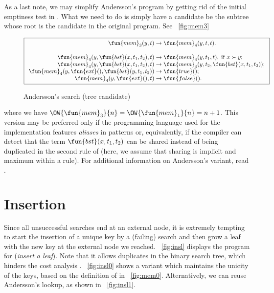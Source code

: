 As a last note, we may simplify Andersson's program by getting rid of
the initial emptiness test in . What we need to do is
simply have a candidate be the subtree whose root is the candidate in
the original program. See \fig~\vref{fig:mem3}
\begin{figure}[b]
\begin{equation*}
\boxed{
\begin{array}{r@{\;}l@{\;}l}
  \fun{mem}_3(y,t) & \rightarrow & \fun{mem}_4(y,t,t).\\
  \\
  \fun{mem}_4(y,\fun{bst}(x,t_1,t_2),t) & \rightarrow &
  \fun{mem}_4(y,t_1,t),\; \text{if \(x \succ y\)};\\
\fun{mem}_4(y,\fun{bst}(x,t_1,t_2),t) & \rightarrow &
  \fun{mem}_4(y,t_2,\fun{bst}(x,t_1,t_2));\\
\fun{mem}_4(y,\fun{ext}(),\fun{bst}(y,t_1,t_2)) & \rightarrow & \fun{true}();\\
\fun{mem}_4(y,\fun{ext}(),t) & \rightarrow & \fun{false}().
\end{array}}
\end{equation*}
\caption{Andersson's search (tree candidate)}
\label{fig:mem3}
\end{figure}
where we have \(\OW{\fun{mem}_3}{n} = \OW{\fun{mem}_1}{n} = n + 1\).
This version may be preferred only if the programming language used
for the implementation features \emph{aliases}
in patterns or, equivalently, if the compiler can detect that the term
\(\fun{bst}(x,t_1,t_2)\) can be shared instead of being duplicated in
the second rule of  (here, we assume that sharing is
implicit and maximum within a rule). For
additional information on Andersson's variant, read
\cite{Spuler_1992}.


\section{Insertion}
\label{sec:bst:insertion}


Since all unsuccessful searches end at an external node, it is
extremely tempting to start the insertion of a unique key by a
(failing) search and then grow a leaf with the new key at the external
node we reached. \Fig~\vref{fig:insl} displays the program for
 (\emph{insert a leaf}). Note
that it allows duplicates in the binary search tree, which hinders the
cost analysis \citep{Burge_1976,ArchibaldClement_2006,Pasanen_2010}.
\Fig~\vref{fig:insl0} shows a variant which maintains the unicity of
the keys, based on the definition of
 in
\fig~\vref{fig:mem0}. Alternatively, we can reuse Andersson's lookup,
as shown in \fig~\vref{fig:insl1}.

